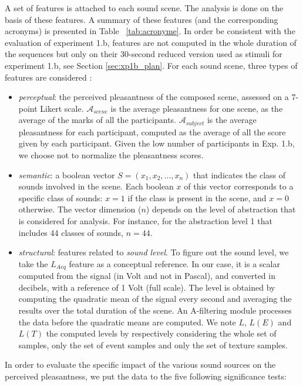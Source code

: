 \documentclass[preprint,12pt]{elsarticle}
\begin{document}
A set of features is attached to each sound scene. The analysis is done on the basis of these features. A summary of these features (and the corresponding acronyms) is presented in Table ~\ref{tab:acronyme}. In order be consistent with the evaluation of experiment 1.b, features are not computed in the whole duration of the sequences but only on their 30-second reduced version used as stimuli for experiment 1.b, see Section \ref{sec:xp1b_plan}.
For each sound scene, three types of features are considered :
\begin{itemize}
\item \emph{perceptual}: the perceived pleasantness of the composed scene, assessed on a 7-point Likert scale. $\mathcal{A}_{scene}$ is the average pleasantness for one scene, as the average of the marks of all the participants. $\mathcal{A}_{subject}$ is the average pleasantness for each participant, computed as the average of all the score given by each participant. Given the low number of participants in Exp. 1.b, we choose not to normalize the pleasantness scores.
\item \emph{semantic}: a boolean vector $S = (x_1, x_2, \ldots, x_n)$ that indicates the class of sounds involved in the scene. Each boolean $x$ of this vector corresponds to a specific class of sounds: $x = 1$ if the class is present in the scene, and $x = 0$ otherwise. The vector dimension ($n$) depends on the level of abstraction that is considered for analysis. For instance, for the abstraction level 1 that includes 44 classes of sounds, $n = 44$.
\item \emph{structural}: features related to \emph{sound level}. To figure out the sound level, we take the $L_{Aeq}$ feature as a conceptual reference. In our case, it is a scalar computed from the  signal (in Volt and not in Pascal), and converted in decibels, with a reference of 1 Volt (full scale). The level is obtained by computing the quadratic mean of the signal every second and averaging the results over the total duration of the scene. An A-filtering module processes the data before the quadratic means are computed. We note $L$, $L(E)$ and $L(T)$ the computed levels by respectively considering the whole set of samples, only the set of event samples and only the set of texture samples.
\end{itemize}

In order to evaluate the specific impact of the various sound sources on the perceived pleasantness, we put the data to the five following significance tests:
\end{document}
